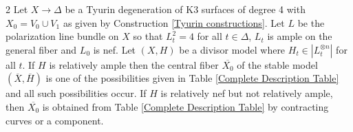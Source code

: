 \documentclass[a4paper]{amsart}
\theoremstyle{definition}
\theoremstyle{plain}
\theoremstyle{remark}
\begin{document}
\begin{customthm}{2}\label{list of nef models}
Let $X\rightarrow\Delta$ be a Tyurin degeneration of K3 surfaces of degree 4  with $X_0=V_0\cup V_1$ as given by Construction \ref{Tyurin constructions}. Let $L$ be the polarization line bundle on $X$ so that $L_t^2=4$ for all $t\in \Delta$, $L_t$ is ample on the general fiber and $L_0$ is nef. Let $(X,H)$ be a divisor model where  $H_t\in|L_t^{\otimes n}|$ for all $t$. If $H$ is relatively ample then the central fiber $\overline{X_0}$ of the stable model $\left(\overline{X},\overline{H}\right)$ is one of the possibilities given in Table \ref{Complete Description Table} and all such possibilities occur. If $H$ is relatively nef but not relatively ample, then $\overline{X_0}$ is obtained from Table \ref{Complete Description Table} by contracting curves or a component.


\end{customthm}
\end{document}
